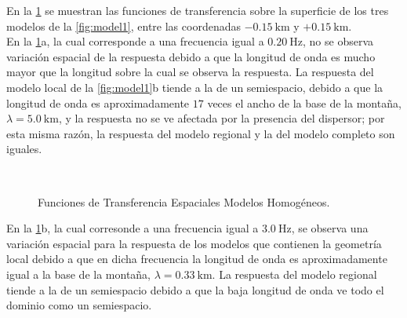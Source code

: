 \documentclass[spanish,letterpaper,12pt,twoside,openany]{article}
\begin{document}
En la \cref{fig:ftspatial} se muestran las funciones de transferencia sobre la superficie de los tres modelos de la \cref{fig:model1}, entre las coordenadas $-0.15\ \text{km}$ y $+0.15\ \text{km}$.\\
%
En la \cref{fig:ftspatial}a, la cual corresponde a una frecuencia igual a $0.20\ \text{Hz}$, no se observa variación espacial de la respuesta debido a que la longitud de onda es mucho mayor que la longitud sobre la cual se observa la respuesta. La respuesta del modelo local de la \cref{fig:model1}b tiende a la de un semiespacio, debido a que la longitud de onda es aproximadamente $17$ veces el ancho de la base de la montaña, $\lambda= 5.0\ \text{km}$, y la respuesta no se ve afectada por la presencia del dispersor; por esta misma razón, la respuesta del modelo regional y la del modelo completo son iguales.
%
\begin{figure}[H]
	\centering
	\\
	\vspace{-.5 cm}
    \caption{Funciones de Transferencia Espaciales Modelos Homogéneos.}
    \label{fig:ftspatial}
    \vspace{-1 cm}
\end{figure}
%
En la \cref{fig:ftspatial}b, la cual corresonde a una frecuencia igual a $3.0\ \text{Hz}$, se observa una variación espacial para la respuesta de los modelos que contienen la geometría local debido a que en dicha frecuencia la longitud de onda es aproximadamente igual a la base de la montaña, $\lambda = 0.33\ \text{km}$. La respuesta del modelo regional tiende a la de un semiespacio debido a que la baja longitud de onda ve todo el dominio como un semiespacio.
\end{document}
